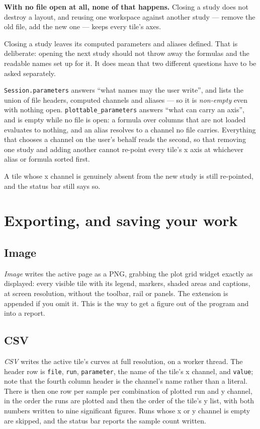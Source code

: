 \documentclass[11pt,a4paper,oneside]{report}
\newcommand{\code}[1]{\texttt{#1}}
\begin{document}
\textbf{With no file open at all, none of that happens.} Closing a study does
not destroy a layout, and reusing one workspace against another study --- remove
the old file, add the new one --- keeps every tile's axes.

Closing a study leaves its computed parameters and aliases defined. That is
deliberate: opening the next study should not throw away the formulas and the
readable names set up for it. It does mean that two different questions have to
be asked separately.

\code{Session.parameters} answers ``what names may the user write'', and lists
the union of file headers, computed channels and aliases --- so it is
\emph{non-empty} even with nothing open. \code{plottable\_parameters} answers
``what can carry an axis'', and is empty while no file is open: a formula over
columns that are not loaded evaluates to nothing, and an alias resolves to a
channel no file carries. Everything that chooses a channel on the user's behalf
reads the second, so that removing one study and adding another cannot re-point
every tile's x axis at whichever alias or formula sorted first.

A tile whose x channel is genuinely absent from the new study is still
re-pointed, and the status bar still says so.

\chapter{Exporting, and saving your work}

\section{Image}

\emph{Image} writes the active page as a PNG, grabbing the plot grid widget
exactly as displayed: every visible tile with its legend, markers, shaded areas
and captions, at screen resolution, without the toolbar, rail or panels. The
extension is appended if you omit it. This is the way to get a figure out of the
program and into a report.

\section{CSV}

\emph{CSV} writes the active tile's curves at full resolution, on a worker
thread. The header row is \code{file}, \code{run}, \code{parameter}, the name of
the tile's x channel, and \code{value}; note that the fourth column header is the
channel's name rather than a literal. There is then one row per sample per
combination of plotted run and y channel, in the order the runs are plotted and
then the order of the tile's y list, with both numbers written to nine
significant figures. Runs whose x or y channel is empty are skipped, and the
status bar reports the sample count written.
\end{document}
